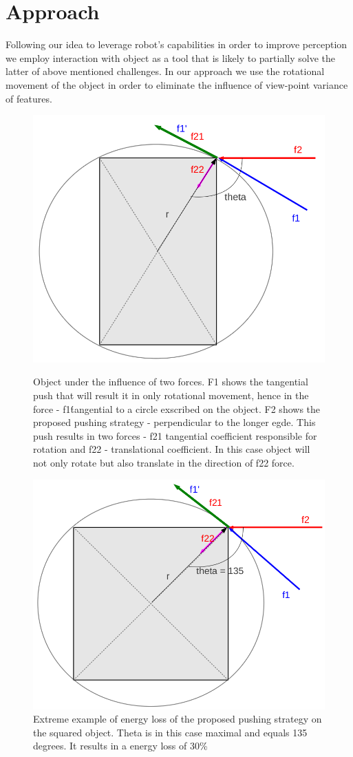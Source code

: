 \section{Approach}

Following our idea to leverage robot's capabilities in order to improve perception we employ interaction with object as a tool that is likely to partially solve the latter of above mentioned challenges. In our approach we use the rotational movement of the object in order to eliminate the influence of view-point variance of features.

\begin{figure}

\includegraphics[width=0.5\columnwidth]{figures/rectangle-angle.png}\\


\caption{Object under the influence of two forces. F1 shows the tangential push that will result it in only rotational movement, hence in the force - f1\' tangential to a circle exscribed on the object. F2 shows the proposed pushing strategy - perpendicular to the longer egde. This push results in two forces - f21 tangential coefficient responsible for rotation and f22 - translational coefficient. In this case object will not only rotate but also translate in the direction of f22 force.  }
\label{fig:angles-rectangle}
\end{figure}


\begin{figure}
 

\includegraphics[width=0.5\columnwidth]{figures/square-angle.png}


\caption{Extreme example of energy loss of the proposed pushing strategy on the squared object. Theta is in this case maximal and equals 135 degrees. It results in a energy loss of 30\%  }
\label{fig:angles-square}
\end{figure}

